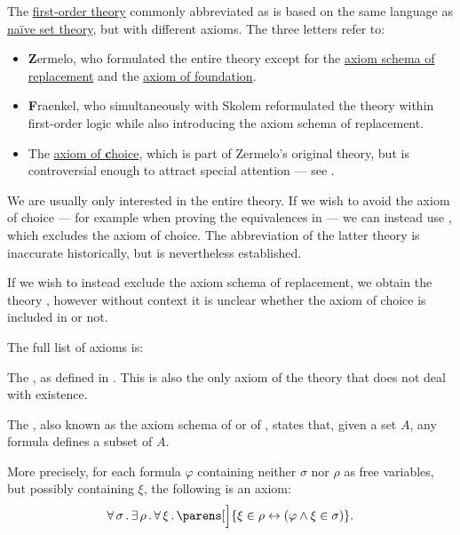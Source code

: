 \begin{definition}\label{def:zfc}
  The \hyperref[def:first_order_theory]{first-order theory} commonly abbreviated as  is based on the same language as \hyperref[def:naive_set_theory]{na\"ive set theory}, but with different axioms. The three letters refer to:
  \begin{itemize}
    \item \textbf{Z}ermelo, who formulated the entire theory except for the \hyperref[def:zfc/replacement]{axiom schema of replacement} and the \hyperref[def:zfc/foundation]{axiom of foundation}.
    \item \textbf{F}raenkel, who simultaneously with Skolem reformulated the theory within first-order logic while also introducing the axiom schema of replacement.
    \item The \hyperref[def:zfc/choice]{axiom of \textbf{c}hoice}, which is part of Zermelo's original theory, but is controversial enough to attract special attention --- see .
  \end{itemize}

  We are usually only interested in the entire theory. If we wish to avoid the axiom of choice --- for example when proving the equivalences in  --- we can instead use , which excludes the axiom of choice. The abbreviation of the latter theory is inaccurate historically, but is nevertheless established.

  If we wish to instead exclude the axiom schema of replacement, we obtain the theory , however without context it is unclear whether the axiom of choice is included in  or not.

  The full list of axioms is:
  \begin{thmenum}
     The , as defined in . This is also the only axiom of the theory that does not deal with existence.

     The , also known as the axiom schema of  or of , states that, given a set \( A \), any formula defines a subset of \( A \).

    More precisely, for each formula \( \varphi \) containing neither \( \sigma \) nor \( \rho \) as free variables, but possibly containing \( \xi \), the following is an axiom:
    \begin{equation}\label{eq:def:zfc/specification}
      \qforall \sigma \qexists \rho \qforall \xi \parens[\Big]{ \xi \in \rho \leftrightarrow (\varphi \wedge \xi \in \sigma) }.
    \end{equation}


\end{thmenum}
\end{definition}
